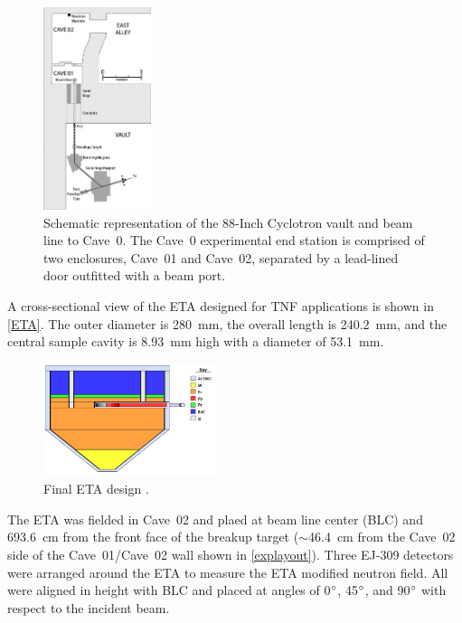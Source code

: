 \documentclass[twocolumn,10pt,final]{asme2ej}
\begin{document}
\vspace{-0.4 cm}
\begin{figure} [htp!]
\centering
\includegraphics[width=0.28\textwidth]{../figs/vault_scaled.eps}
\caption{Schematic representation of the 88-Inch Cyclotron vault and beam line to Cave~0. The Cave~0 experimental end station is comprised of two enclosures, Cave~01 and Cave~02, separated by a lead-lined door outfitted with a beam port.}
\label{explayout}
\vspace{-0.4 cm}
\end{figure}

A cross-sectional view of the ETA designed for TNF applications is shown in \autoref{ETA}.
The outer diameter is 280~mm, the overall length is 240.2~mm, and the central sample cavity is 8.93~mm high with a diameter of 53.1~mm.

\begin{figure} [htp!]
 \centering
 \includegraphics[trim = 0cm 0cm 0cm 0cm, clip, width=0.45\textwidth]{../Figs/ETA.png}
   \caption{Final ETA design \cite{Bevins2017}.}
     \label{ETA}
\vspace{-0.4 cm}
\end{figure}


The ETA was fielded in Cave~02 and plaed at beam line center (BLC) and 693.6~cm from the front face of the breakup target ($\sim$46.4~cm from the Cave~02 side of the Cave~01/Cave~02 wall shown in \autoref{explayout}).
Three EJ-309 detectors were arranged around the ETA to measure the ETA modified neutron field.
All were aligned in height with BLC and placed at angles of 0$\degree$, 45$\degree$, and 90$\degree$ with respect to the incident beam.  
\end{document}
